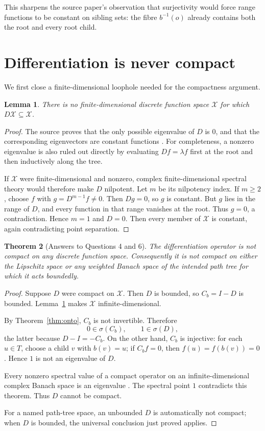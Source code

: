\documentclass[11pt]{article}
\newtheorem{theorem}{Theorem}
\newtheorem{lemma}[theorem]{Lemma}
\newcommand{\X}{\mathcal X}
\newcommand{\Cb}{C_b}
\newcommand{\spec}{\sigma}
\begin{document}
This sharpens the source paper's observation that surjectivity would force
range functions to be constant on sibling sets: the fibre
$b^{-1}(o)$ already contains both the root and every root child.

\section{Differentiation is never compact}

We first close a finite-dimensional loophole needed for the compactness
argument.

\begin{lemma}\label{lem:infinite}
There is no finite-dimensional discrete function space $\X$ for which
$D\X\subseteq\X$.
\end{lemma}

\begin{proof}
The source proves that the only possible eigenvalue of $D$ is $0$, and that
the corresponding eigenvectors are constant functions
\cite[Theorem 2.14]{AllenJackson}. For completeness, a nonzero eigenvalue is
also ruled out directly by evaluating $Df=\lambda f$ first at the root and
then inductively along the tree.

If $\X$ were finite-dimensional and nonzero, complex finite-dimensional
spectral theory would therefore make $D$ nilpotent. Let $m$ be its
nilpotency index. If $m\ge2$, choose $f$ with
$g=D^{m-1}f\ne0$. Then $Dg=0$, so $g$ is constant. But $g$ lies in the range
of $D$, and every function in that range vanishes at the root. Thus $g=0$, a
contradiction. Hence $m=1$ and $D=0$. Then every member of $\X$ is constant,
again contradicting point separation.
\end{proof}

\begin{theorem}[Answers to Questions 4 and 6]\label{thm:compact}
The differentiation operator is not compact on any discrete function space.
Consequently it is not compact on either the Lipschitz space or any weighted
Banach space of the intended path tree for which it acts boundedly.
\end{theorem}

\begin{proof}
Suppose $D$ were compact on $\X$. Then $D$ is bounded, so $\Cb=I-D$ is
bounded. Lemma~\ref{lem:infinite} makes $\X$ infinite-dimensional.

By Theorem~\ref{thm:onto}, $\Cb$ is not invertible. Therefore
\[
  0\in\spec(\Cb),\qquad
  1\in\spec(D),
\]
the latter because $D-I=-\Cb$. On the other hand, $\Cb$ is injective: for
each $u\in T$, choose a child $v$ with $b(v)=u$; if $\Cb f=0$, then
$f(u)=f(b(v))=0$. Hence $1$ is not an eigenvalue of $D$.

Every nonzero spectral value of a compact operator on an infinite-dimensional
complex Banach space is an eigenvalue \cite[Chapter VII, Section 4]{Conway}.
The spectral point $1$ contradicts this theorem. Thus $D$ cannot be compact.

For a named path-tree space, an unbounded $D$ is automatically not compact;
when $D$ is bounded, the universal conclusion just proved applies.
\end{proof}
\end{document}
